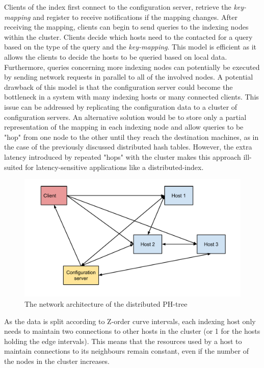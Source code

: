 \documentclass[11pt,a4paper]{globis-book}
\begin{document}
Clients of the index first connect to the configuration server, retrieve the \textit{key-mapping} and register to receive notifications if the mapping changes. After receiving the mapping, clients can begin to send queries to the indexing nodes within the cluster. Clients decide which hosts need to the contacted for a query based on the type of the query and the \textit{key-mapping}. This model is efficient as it allows the clients to decide the hosts to be queried based on local data. Furthermore, queries concerning more indexing nodes can potentially be executed by sending network requests in parallel to all of the involved nodes. A potential drawback of this model is that the configuration server could become the bottleneck in a system with many indexing hosts or many connected clients. This issue can be addressed by replicating the configuration data to a cluster of configuration servers. An alternative solution would be to store only a partial representation of the mapping in each indexing node and allow queries to be "hop" from one node to the other until they reach the destination machines, as in the case of the previously discussed distributed hash tables. However, the extra latency introduced by repeated "hops" with the cluster makes this approach ill-suited for latency-sensitive applications like a distributed-index.  

\begin{figure}[t]
    \centering 
    \includegraphics[scale=0.6]{images/architecture}
    \caption{The network architecture of the distributed PH-tree}
    \label{fig:architecture}
\end{figure}

As the data is split according to Z-order curve intervals, each indexing host only needs to maintain two connections to other hosts in the cluster (or 1 for the hosts holding the edge intervals). This means that the resources used by a host to maintain connections to its neighbours remain constant, even if the number of the nodes in the cluster increases. 
\end{document}
